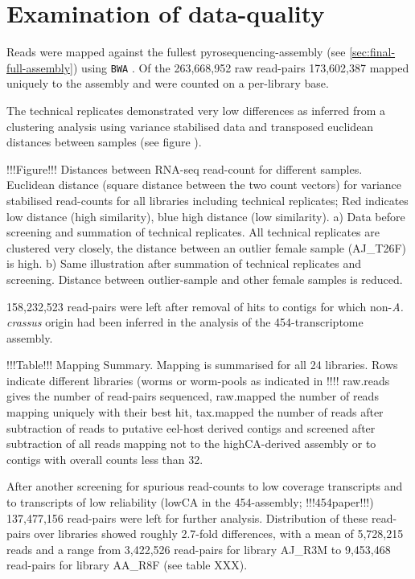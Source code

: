 \documentclass[10pt]{article}
\begin{document}
\section{Examination of data-quality}

Reads were mapped against the fullest pyrosequencing-assembly (see
\ref{sec:final-full-assembly}) using \texttt{BWA}
\cite{pmid20080505}. Of the 263,668,952 raw read-pairs 173,602,387
mapped uniquely to the assembly and were counted on a per-library
base. 

The technical replicates demonstrated very low differences as inferred
from a clustering analysis using variance stabilised data and
transposed euclidean distances between samples (see figure ).

!!!Figure!!! Distances between RNA-seq read-count for different
samples. Euclidean distance (square distance between the two count
vectors) for variance stabilised read-counts for all libraries
including technical replicates; Red indicates low distance (high
similarity), blue high distance (low similarity). a) Data before
screening and summation of technical replicates. All technical
replicates are clustered very closely, the distance between an outlier
female sample (AJ\_T26F) is high. b) Same illustration after summation
of technical replicates and screening. Distance between outlier-sample
and other female samples is reduced.

158,232,523 read-pairs were left after removal of hits to contigs for
which non-\textit{A. crassus} origin had been inferred in the
analysis of the 454-transcriptome assembly.

!!!Table!!! Mapping Summary. Mapping is summarised for all 24
libraries. Rows indicate different libraries (worms or worm-pools as
indicated in !!!! raw.reads gives the number of read-pairs sequenced,
raw.mapped the number of reads mapping uniquely with their best hit,
tax.mapped the number of reads after subtraction of reads to putative
eel-host derived contigs and screened after subtraction of all reads
mapping not to the highCA-derived assembly or to contigs with overall
counts less than 32.

After another screening for spurious read-counts to low coverage
transcripts and to transcripts of low reliability (lowCA in the
454-assembly; !!!454paper!!!) 137,477,156 read-pairs were left for
further analysis. Distribution of these read-pairs over libraries
showed roughly 2.7-fold differences, with a mean of 5,728,215 reads
and a range from 3,422,526 read-pairs for library AJ\_R3M to 9,453,468
read-pairs for library AA\_R8F (see table XXX).
\end{document}

